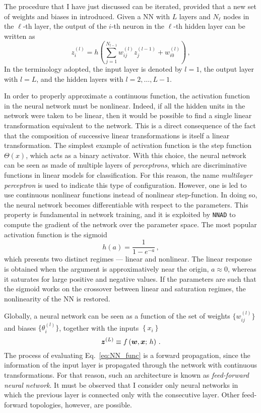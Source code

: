 The procedure that I have just discussed can be iterated, provided that a new set of weights and biases in introduced. Given a NN with $L$ layers and $N_{\ell}$ nodes in the $\ell$-th layer, the output of the $i$-th neuron in the $\ell$-th hidden layer can be written as
\begin{equation}
  z_{i}^{(l)} = h \left( \sum_{j=1}^{N_{l-1}} w_{ij}^{(l)} z_{j}^{(l-1)} + w_{i0}^{(l)} \right) \,,
  \label{eq:activity}
\end{equation}
In the terminology adopted, the input layer is denoted by $l=1$, the output layer with $l=L$, and the hidden layers with $l=2,\dots,L-1$.%

In order to properly approximate a continuous function, the activation function in the neural network must be nonlinear. Indeed, if all the hidden units in the network were taken to be linear, then it would be possible to find a single linear transformation equivalent to the network. This is a direct consequence of the fact that the composition of successive linear transformations is itself a linear transformation. The simplest example of activation function is the step function $\Theta(x)$, which acts as a binary activator. With this choice, the neural network can be seen as made of multiple layers of \textit{perceptrons}, which are discriminative functions in linear models for classification. For this reason, the name \textit{multilayer perceptron} is used to indicate this type of configuration. However, one is led to use continuous nonlinear functions instead of nonlinear step-function. In doing so, the neural network becomes differentiable with respect to the parameters. This property is fundamental in network training, and it is exploited by \texttt{NNAD} to compute the gradient of the network over the parameter space. The most popular activation function is the sigmoid
\begin{equation}
  h(a) = \frac{1}{1 - e^{-a}}\,,
  \label{eq:sigmoid}
\end{equation}
which presents two distinct regimes — linear and nonlinear. The linear response is obtained when the argument is approximatively near the origin, $a \approx 0$, whereas it saturates for large positive and negative values. If the parameters are such that the sigmoid works on the crossover between linear and saturation regimes, the nonlinearity of the NN is restored.\par
Globally, a neural network can be seen as a function of the set of weights $\{ w^{(l)}_{ij} \}$ and biases $\{ \theta_{i}^{(l)} \}$, together with the inputs $\left\{  x_i\right\}$
\begin{equation}
  \vb*{z}^{(L)} \equiv f \left( \vb*{w}, \vb*{x}; \, h \right) \,.
  \label{eq:NN_func}
\end{equation}
The process of evaluating Eq.~\eqref{eq:NN_func} is a forward propagation, since the information of the input layer is propagated through the network with continuous transformations. For that reason, such an architecture is known as \textit{feed-forward neural network}. It must be observed that I consider only neural networks in which the previous layer is connected only with the consecutive layer. Other feed-forward topologies, however, are possible.%

